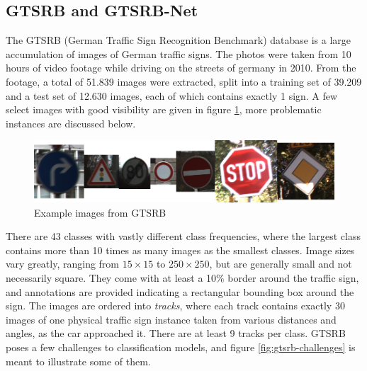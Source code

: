\documentclass[11pt, a4paper]{article}
\begin{document}
\subsection{GTSRB and GTSRB-Net}
\label{sec:generation-large-sets:gtsrb}
The GTSRB (German Traffic Sign Recognition Benchmark) database is a large accumulation of images of German traffic signs. The photos were taken from 10 hours of video footage while driving on the streets of germany in 2010. From the footage, a total of 51.839 images were extracted, split into a training set of 39.209 and a test set of 12.630 images, each of which contains exactly 1 sign. A few select images with good visibility are given in figure \ref{fig:gtsrb-overview}, more problematic instances are discussed below.

\begin{figure}[h!tb]
	\centering
	\includegraphics[width=\textwidth]{images/gtsrb/overview.png}
	\caption{Example images from GTSRB}
	\label{fig:gtsrb-overview}
\end{figure}

There are 43 classes with vastly different class frequencies, where the largest class contains more than 10 times as many images as the smallest classes. Image sizes vary greatly, ranging from $15\times15$ to $250\times 250$, but are generally small and not necessarily square. They come with at least a 10\% border around the traffic sign, and annotations are provided indicating a rectangular bounding box around the sign. The images are ordered into \emph{tracks}, where each track contains exactly 30 images of one physical traffic sign instance taken from various distances and angles, as the car approached it. There are at least 9 tracks per class. GTSRB poses a few challenges to classification models, and figure \ref{fig:gtsrb-challenges} is meant to illustrate some of them.
\end{document}
